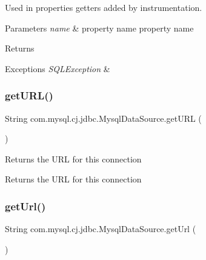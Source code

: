Used in properties getters added by instrumentation.


\begin{DoxyParams}{Parameters}
{\em name} & property name property name \\
\hline
\end{DoxyParams}
\begin{DoxyReturn}{Returns}

\end{DoxyReturn}

\begin{DoxyExceptions}{Exceptions}
{\em S\+Q\+L\+Exception} & \\
\hline
\end{DoxyExceptions}
\mbox{\label{classcom_1_1mysql_1_1cj_1_1jdbc_1_1_mysql_data_source_aa623564ec5fb8ced6d39d8cd441b70bb}} 
\subsubsection{\texorpdfstring{get\+U\+R\+L()}{getURL()}}
{\footnotesize\ttfamily String com.\+mysql.\+cj.\+jdbc.\+Mysql\+Data\+Source.\+get\+U\+RL (\begin{DoxyParamCaption}{ }\end{DoxyParamCaption})}

Returns the U\+RL for this connection

\begin{DoxyReturn}{Returns}
the U\+RL for this connection 
\end{DoxyReturn}
\mbox{\label{classcom_1_1mysql_1_1cj_1_1jdbc_1_1_mysql_data_source_a5baa5243975b05f88cdb631c88a60185}} 
\subsubsection{\texorpdfstring{get\+Url()}{getUrl()}}
{\footnotesize\ttfamily String com.\+mysql.\+cj.\+jdbc.\+Mysql\+Data\+Source.\+get\+Url (\begin{DoxyParamCaption}{ }\end{DoxyParamCaption})}

